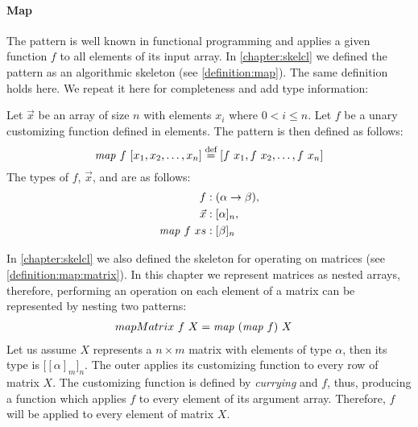 \paragraph{Map}
The \map pattern is well known in functional programming and applies a given function $f$ to all elements of its input array.
In \autoref{chapter:skelcl} we defined the \map pattern as an algorithmic skeleton (see \autoref{definition:map}).
The same definition holds here.
We repeat it here for completeness and add type information:
\begin{definition}
  \label{definition:pattern:map}
  Let $\vec{x}$ be an array of size $n$ with elements $x_i$ where $0 < i \leq n$.
  Let $f$ be a unary customizing function defined in elements.
  The \map pattern is then defined as follows:
  \begin{equation*}
    \text{\textit{map}}\ f\ [x_1, x_2, \dots, x_n] \stackrel{\textrm{\scriptsize def}}{=} [f\ x_1, f\ x_2, \dots, f\ x_n]
  \end{equation*}
  The types of $f$, $\vec{x}$, and \map are as follows:
  \begin{align*}
    f &: (\alpha \rightarrow \beta),\\
    \vec{x} &: [\alpha]_n,\\
    \text{\textit{map}}\ f\ xs &: [\beta]_n
  \end{align*}
\end{definition}

\noindent
In \autoref{chapter:skelcl} we also defined the \map skeleton for operating on matrices (see \autoref{definition:map:matrix}).
In this chapter we represent matrices as nested arrays, therefore, performing an operation on each element of a matrix can be represented by nesting two \map patterns:
\begin{align*}
  mapMatrix\ f\ X &= \text{\textit{map}}\ (\text{\textit{map}}\ f)\ X
\end{align*}
Let us assume $X$ represents a $n\times m$ matrix with elements of type $\alpha$, then its type is $\big[[\alpha]_m\big]_n$.
The outer \map applies its customizing function to every row of matrix $X$.
The customizing function is defined by \emph{currying} \map and $f$, thus, producing a function which applies $f$ to every element of its argument array.
Therefore, $f$ will be applied to every element of matrix $X$.

